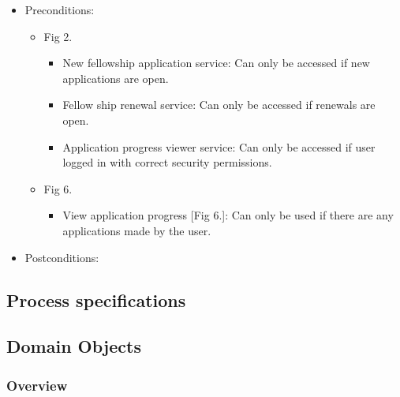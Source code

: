 \documentclass[12pt]{article}
\begin{document}
\begin{itemize}

\item Preconditions:
\begin{itemize}
	\item Fig 2.
	\begin{itemize}
		\item New fellowship application service: Can only be accessed if new applications are open.
		\item Fellow ship renewal service: Can only be accessed if renewals are open.
		\item Application progress viewer service: Can only be accessed if user logged in with correct security permissions.	
	\end{itemize}
	
	\item Fig 6.
		\begin{itemize}
			\item View application progress [Fig 6.]: Can only be used if there are any applications made by the user.
		\end{itemize}


\end{itemize}
\item Postconditions:
\end{itemize}

\vspace{0.2in}

\subsection{Process specifications} %
\vspace{0.2in}

\vspace{0.2in}

\subsection{Domain Objects} %
\subsubsection{Overview}
\end{document}
